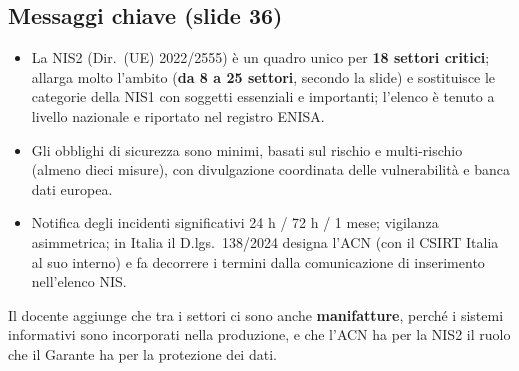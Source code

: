 \subsection{Messaggi chiave (slide 36)}
\begin{itemize}
  \item La NIS2 (Dir.~(UE) 2022/2555) è un quadro unico per \textbf{18 settori critici}; allarga molto
    l'ambito (\textbf{da 8 a 25 settori}, secondo la slide) e sostituisce le categorie della NIS1 con
    soggetti essenziali e importanti; l'elenco è tenuto a livello nazionale e riportato nel registro
    ENISA.
  \item Gli obblighi di sicurezza sono minimi, basati sul rischio e multi-rischio (almeno dieci misure),
    con divulgazione coordinata delle vulnerabilità e banca dati europea.
  \item Notifica degli incidenti significativi 24 h / 72 h / 1 mese; vigilanza asimmetrica; in Italia
    il D.lgs.~138/2024 designa l'ACN (con il CSIRT Italia al suo interno) e fa decorrere i termini dalla
    comunicazione di inserimento nell'elenco NIS.
\end{itemize}
Il docente aggiunge che tra i settori ci sono anche \textbf{manifatture}, perché i sistemi informativi
sono incorporati nella produzione, e che l'ACN ha per la NIS2 il ruolo che il Garante ha per la
protezione dei dati.

